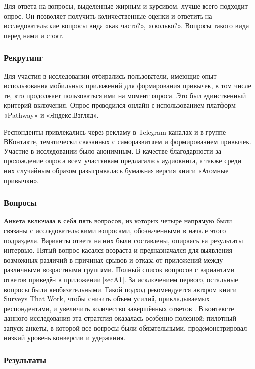 \documentclass[pdflatex,sn-mathphys-num]{sn-jnl}%
\theoremstyle{thmstyleone}%
\theoremstyle{thmstyletwo}%
\theoremstyle{thmstylethree}%
\begin{document}
Для ответа на вопросы, выделенные жирным и курсивом, лучше всего подходит опрос. Он позволяет получить количественные оценки и ответить на исследовательские вопросы вида «как часто?», «сколько?». Вопросы такого вида перед нами и стоят.

\subsubsection{Рекрутинг}

Для участия в исследовании отбирались пользователи, имеющие опыт использования мобильных приложений для формирования привычек, в том числе те, кто продолжает пользоваться ими на момент опроса. Это был единственный критерий включения. Опрос проводился онлайн с использованием платформ «Pathway» и «Яндекс.Взгляд».

Респонденты привлекались через рекламу в Telegram-каналах и в группе ВКонтакте, тематически связанных с саморазвитием и формированием привычек. Участие в исследовании было анонимным. В качестве благодарности за прохождение опроса всем участникам предлагалась аудиокнига, а также среди них случайным образом разыгрывалась бумажная версия книги «Атомные привычки».

\subsubsection{Вопросы}

Анкета включала в себя пять вопросов, из которых четыре напрямую были связаны с исследовательскими вопросами, обозначенными в начале этого подраздела. Варианты ответа на них были составлены, опираясь на результаты интервью. Пятый вопрос касался возраста и предназначался для выявления возможных различий в причинах срывов и отказа от приложений между различными возрастными группами. Полный список вопросов с вариантами ответов приведён в приложении \ref{secA1}. За исключением первого, остальные вопросы были необязательными. Такой подход рекомендуется автором книги Surveys That Work, чтобы снизить объем усилий, прикладываемых респондентами, и увеличить количество завершённых ответов \cite{jarrett2021surveys}. В контексте данного исследования эта стратегия оказалась особенно полезной: пилотный запуск анкеты, в которой все вопросы были обязательными, продемонстрировал низкий уровень конверсии и удержания. 

\subsubsection{Результаты}
\end{document}
